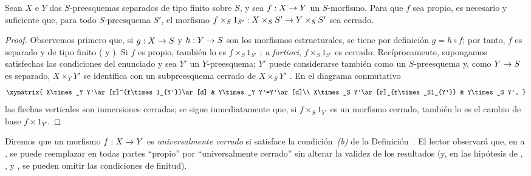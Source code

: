 \documentclass[oneside,10pt]{amsart}
\makeatletter
\newcommand{\ega@arrow}[2]{\mathchoice{#1}{#2}{#2}{#2}}
\renewcommand{\to}{\ega@arrow{\longrightarrow}{\rightarrow}}
\newcommand{\oldpage}[2][]{\marginnote{\normalfont\footnotesize\textbf{#1}~|~#2}\ignorespaces}
\let\EGAOriginalLabel\label
\renewcommand{\label}[1]{\phantomsection\EGAOriginalLabel{#1}}
\makeatother
\begin{document}
\begin{corollary}[5.4.8]
\label{II.5.4.8}
Sean $X$ e $Y$ dos $S$-preesquemas separados de tipo finito sobre $S$, y sea $f:X\to Y$ un $S$-morfismo.
Para que $f$ sea propio, es necesario y suficiente que, para todo $S$-preesquema $S'$, el morfismo $f\times_S 1_{S'}:X\times_S S'\to Y\times_S S'$ sea cerrado.
\end{corollary}

\begin{proof}
Observemos primero que, si $g:X\to S$ y $h:Y\to S$ son los morfismos estructurales, se tiene por definición $g=h\circ f$; por tanto, $f$ es separado y de tipo finito ( y ).
Si $f$ es propio, también lo es $f\times_S 1_{S'}$ ; \emph{a fortiori}, $f\times_S 1_{S'}$ es cerrado.
Recíprocamente, supongamos satisfechas las condiciones del enunciado y sea $Y'$ un $Y$-preesquema;
$Y'$ puede considerarse también como un $S$-preesquema y, como $Y\to S$ es separado, $X\times_Y Y'$ se identifica con un subpreesquema cerrado de $X\times_S Y'$ .
En el diagrama conmutativo
\[
  \xymatrix{
    X\times_Y Y'\ar[r]^{f\times1_{Y'}}\ar[d] &
    Y\times_Y Y'=Y'\ar[d]\\
    X\times_S Y'\ar[r]_{f\times_S1_{Y'}} &
    Y\times_S Y',
  }
\]
las flechas verticales son inmersiones cerradas; se sigue inmediatamente que, si $f\times_S1_{Y'}$ es un morfismo cerrado, también lo es el cambio de base $f\times1_{Y'}$.
\end{proof}

\begin{remark}[5.4.9]
\label{II.5.4.9}
Diremos que un morfismo $f:X\to Y$ es \emph{universalmente cerrado} si satisface la condición~\emph{(b)} de la Definición~.
El lector observará que,
\oldpage[II]{103}
en  a , se puede reemplazar en todas partes ``propio'' por ``universalmente cerrado'' sin alterar la validez de los resultados (y, en las hipótesis de , ,  y , se pueden omitir las condiciones de finitud).
\end{remark}
\end{document}
